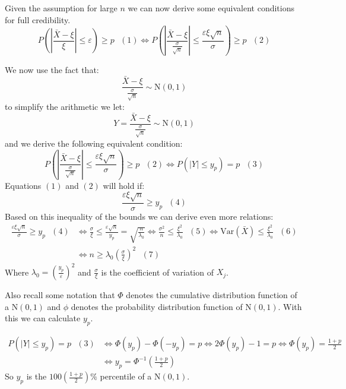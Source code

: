 \documentclass[english,12pt]{article}
\theoremstyle{plain}
\theoremstyle{definition}
\theoremstyle{definition} %
\newcommand{\var}[1]{\mbox{Var} \left( #1 \right)}
\begin{document}
Given the assumption for large $n$ we can now derive some equivalent conditions for full credibility.
\[P\left(\left|\frac{\bar{X}-\xi}{\xi}\right|\le\varepsilon\right)\ge p\text{ } (1)\iff P\left(\left|\frac{\bar{X}-\xi}{\frac{\sigma}{\sqrt{n}}}\right|\le \frac{\varepsilon\xi\sqrt{n}}{\sigma}\right)\ge p\text{ } (2)\]

We now use the fact that:
\[\frac{\bar{X}-\xi}{\frac{\sigma}{\sqrt{n}}}\sim \text{N}(0,1)\]
to simplify the arithmetic we let:
\[Y=\frac{\bar{X}-\xi}{\frac{\sigma}{\sqrt{n}}}\sim \text{N}(0,1)\]
and we derive the following equivalent condition:
\[P\left(\left|\frac{\bar{X}-\xi}{\frac{\sigma}{\sqrt{n}}}\right|\le \frac{\varepsilon\xi\sqrt{n}}{\sigma}\right)\ge p\text{ } (2)\iff P(|Y|\le y_p)=p\text{ }(3)\]
Equations $(1)$ and $(2)$ will hold if: 
\[\frac{\varepsilon\xi\sqrt{n}}{\sigma}\ge y_p\text{ }(4)\]
Based on this inequality of the bounds we can derive even more relations:
\begin{align*}
\frac{\varepsilon\xi\sqrt{n}}{\sigma}\ge y_p\text{ }(4)
&\iff \frac{\sigma}{\xi}\le\frac{\varepsilon\sqrt{n}}{y_p}=\sqrt{\frac{n}{\lambda_0}}
\iff \frac{\sigma^2}{n}\le\frac{\xi^2}{\lambda_0}\text{ }(5)
\iff \var{\bar{X}}\le\frac{\xi^2}{\lambda_0}\text{ }(6)\\
&\iff n\ge\lambda_0\left(\frac{\sigma}{\xi}\right)^2\text{ }(7)
\end{align*}
Where $\lambda_0=\left(\frac{y_p}{\varepsilon}\right)^2$ and $\frac{\sigma}{\xi}$ is the coefficient of variation of $X_j$.

Also recall some notation that $\Phi$ denotes the cumulative distribution function of a $\text{N}(0,1)$ and $\phi$ denotes the probability distribution function of $\text{N}(0,1)$.  With this we can calculate $y_p$.

\begin{align*}
P(|Y|\le y_p)=p\text{ }(3)&
\iff \Phi(y_p)-\Phi(-y_p)=p
\iff 2\Phi(y_p)-1=p
\iff \Phi(y_p)=\frac{1+p}{2}\\
&\iff y_p=\Phi^{-1}\left(\frac{1+p}{2}\right)
\end{align*}
So $y_p$ is the $100\left(\frac{1+p}{2}\right)\%$ percentile of a $\text{N}(0,1)$.
\end{document}
